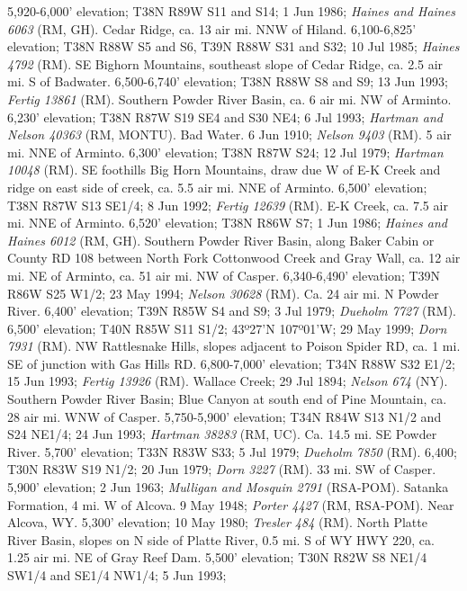5,920-6,000’ elevation; T38N R89W S11 and S14; 1 Jun 1986;
\textit{Haines and Haines 6063} (RM, GH).
Cedar Ridge, ca. 13 air mi. NNW of Hiland. 6,100-6,825’ elevation;
T38N R88W S5 and S6, T39N R88W S31 and S32; 10 Jul 1985;
\textit{Haines 4792} (RM).
SE Bighorn Mountains, southeast slope of Cedar Ridge, ca. 2.5 air mi. S of
Badwater. 6,500-6,740’ elevation; T38N R88W S8 and S9; 13 Jun 1993;
\textit{Fertig 13861} (RM).
Southern Powder River Basin, ca. 6 air mi. NW of Arminto. 6,230’ elevation;
T38N R87W S19 SE4 and S30 NE4; 6 Jul 1993;
\textit{Hartman and Nelson 40363} (RM, MONTU).
Bad Water. 6 Jun 1910; \textit{Nelson 9403} (RM).
5 air mi. NNE of Arminto. 6,300’ elevation; T38N R87W S24; 12 Jul 1979;
\textit{Hartman 10048} (RM).
SE foothills Big Horn Mountains, draw due W of E-K Creek and ridge on east side
of creek, ca. 5.5 air mi. NNE of Arminto. 6,500’ elevation; T38N R87W S13 SE1/4;
8 Jun 1992; \textit{Fertig 12639} (RM).
E-K Creek, ca. 7.5 air mi. NNE of Arminto. 6,520’ elevation; T38N R86W S7;
1 Jun 1986; \textit{Haines and Haines 6012} (RM, GH).
Southern Powder River Basin, along Baker Cabin or County RD 108 between North
Fork Cottonwood Creek and Gray Wall, ca. 12 air mi. NE of Arminto, ca. 51 air
mi. NW of Casper. 6,340-6,490’ elevation; T39N R86W S25 W1/2; 23 May 1994;
\textit{Nelson 30628} (RM).
Ca. 24 air mi. N Powder River. 6,400’ elevation; T39N R85W S4 and S9;
3 Jul 1979; \textit{Dueholm 7727} (RM).
6,500' elevation; T40N R85W S11 S1/2; 43º27'N 107º01'W; 29 May 1999;
\textit{Dorn 7931} (RM).
NW Rattlesnake Hills, slopes adjacent to Poison Spider RD, ca. 1 mi. SE of
junction with Gas Hills RD. 6,800-7,000’ elevation; T34N R88W S32 E1/2;
15 Jun 1993; \textit{Fertig 13926} (RM).
Wallace Creek; 29 Jul 1894; \textit{Nelson 674} (NY).
Southern Powder River Basin; Blue Canyon at south end of Pine Mountain, ca. 28
air mi. WNW of Casper.	5,750-5,900' elevation; T34N R84W S13	N1/2 and
S24 NE1/4; 24 Jun 1993; \textit{Hartman 38283} (RM, UC).
Ca. 14.5 mi. SE Powder River. 5,700’ elevation; T33N R83W S33; 5 Jul 1979;
\textit{Dueholm 7850} (RM).
6,400; T30N R83W S19 N1/2; 20 Jun 1979; \textit{Dorn 3227} (RM).
33 mi. SW of Casper. 5,900’ elevation; 2 Jun 1963;
\textit{Mulligan and Mosquin 2791} (RSA-POM).
Satanka Formation, 4 mi. W of Alcova. 9 May 1948;
\textit{Porter 4427} (RM, RSA-POM).
Near Alcova, WY.  5,300’ elevation; 10 May 1980; \textit{Tresler 484} (RM).
North Platte River Basin, slopes on N side of Platte River, 0.5 mi. S of WY HWY
220, ca. 1.25 air mi. NE of Gray Reef Dam. 5,500’ elevation;
T30N R82W S8 NE1/4 SW1/4 and SE1/4 NW1/4; 5 Jun 1993;
